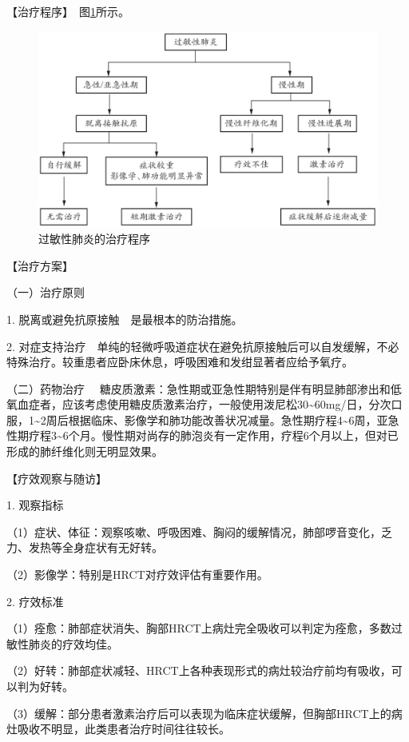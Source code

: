 【治疗程序】　图\ref{fig1-14-4}所示。

\begin{figure}[!htbp]
 \centering
 \includegraphics{./images/Image00032.jpg}
 \captionsetup{justification=centering}
 \caption{过敏性肺炎的治疗程序}
 \label{fig1-14-4}
  \end{figure} 

【治疗方案】

{（一）治疗原则}

1. 脱离或避免抗原接触　是最根本的防治措施。

2.
对症支持治疗　单纯的轻微呼吸道症状在避免抗原接触后可以自发缓解，不必特殊治疗。较重患者应卧床休息，呼吸困难和发绀显著者应给予氧疗。

{（二）药物治疗}
　糖皮质激素：急性期或亚急性期特别是伴有明显肺部渗出和低氧血症者，应该考虑使用糖皮质激素治疗，一般使用泼尼松30\textasciitilde{}60mg/日，分次口服，1\textasciitilde{}2周后根据临床、影像学和肺功能改善状况减量。急性期疗程4\textasciitilde{}6周，亚急性期疗程3\textasciitilde{}6个月。慢性期对尚存的肺泡炎有一定作用，疗程6个月以上，但对已形成的肺纤维化则无明显效果。

【疗效观察与随访】

1. 观察指标

（1）症状、体征：观察咳嗽、呼吸困难、胸闷的缓解情况，肺部啰音变化，乏力、发热等全身症状有无好转。

（2）影像学：特别是HRCT对疗效评估有重要作用。

2. 疗效标准

（1）痊愈：肺部症状消失、胸部HRCT上病灶完全吸收可以判定为痊愈，多数过敏性肺炎的疗效均佳。

（2）好转：肺部症状减轻、HRCT上各种表现形式的病灶较治疗前均有吸收，可以判为好转。

（3）缓解：部分患者激素治疗后可以表现为临床症状缓解，但胸部HRCT上的病灶吸收不明显，此类患者治疗时间往往较长。

